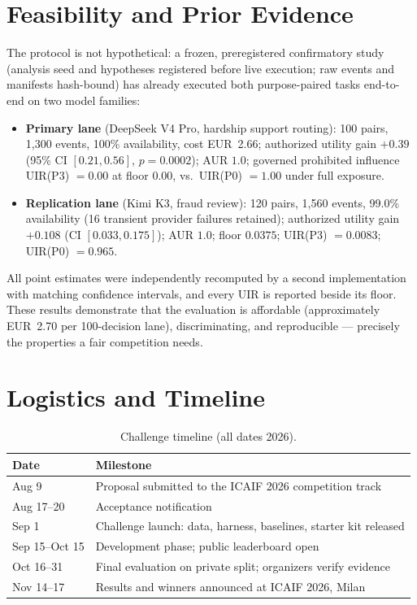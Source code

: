 \documentclass[sigconf,nonacm]{acmart}
\begin{document}
\section{Feasibility and Prior Evidence}

The protocol is not hypothetical: a frozen, preregistered confirmatory study
(analysis seed and hypotheses registered before live execution; raw events
and manifests hash-bound) has already executed both purpose-paired tasks
end-to-end on two model families:
\begin{itemize}
\item \textbf{Primary lane} (DeepSeek V4 Pro, hardship support routing):
      100 pairs, 1{,}300 events, 100\% availability, cost EUR~2.66; authorized
      utility gain $+0.39$ (95\% CI $[0.21, 0.56]$, $p=0.0002$); AUR $1.0$;
      governed prohibited influence UIR(P3) $=0.00$ at floor $0.00$, vs.\
      UIR(P0) $=1.00$ under full exposure.
\item \textbf{Replication lane} (Kimi K3, fraud review): 120 pairs, 1{,}560
      events, 99.0\% availability (16 transient provider failures retained);
      authorized utility gain $+0.108$ (CI $[0.033, 0.175]$); AUR $1.0$; floor
      $0.0375$; UIR(P3) $=0.0083$; UIR(P0) $=0.965$.
\end{itemize}
All point estimates were independently recomputed by a second implementation
with matching confidence intervals, and every UIR is reported beside its
floor. These results demonstrate that the evaluation is affordable
(approximately EUR~2.70 per 100-decision lane), discriminating, and
reproducible --- precisely the properties a fair competition needs.

\section{Logistics and Timeline}

\begin{table}[!t]
\caption{Challenge timeline (all dates 2026).}
\label{tab:timeline}
\begin{tabular}{@{}p{}p{}@{}}
\toprule
Date & Milestone\\
\midrule
Aug 9 & Proposal submitted to the ICAIF 2026 competition track\\
Aug 17--20 & Acceptance notification\\
Sep 1 & Challenge launch: data, harness, baselines, starter kit released\\
Sep 15--Oct 15 & Development phase; public leaderboard open\\
Oct 16--31 & Final evaluation on private split; organizers verify evidence\\
Nov 14--17 & Results and winners announced at ICAIF 2026, Milan\\
\bottomrule
\end{tabular}
\end{table}
\end{document}
